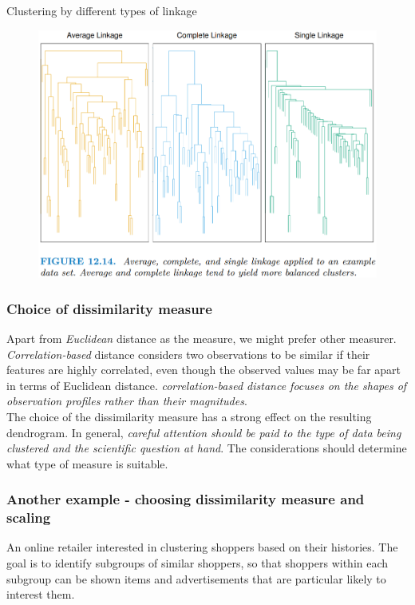 \documentclass[11pt]{article}
\begin{document}
\noindent Clustering by different types of linkage
\begin{figure}[H]
    \centering
    \includegraphics[width=0.7\linewidth]{Hierarchical clustering - visualisation of linkage.png}
\end{figure}

\subsubsection*{Choice of dissimilarity measure}
\noindent Apart from \textit{Euclidean} distance as the measure, we might prefer other measurer. \\

\noindent \textit{Correlation-based} distance considers two observations to be similar if their features are highly correlated, even though the observed values may be far apart in terms of Euclidean distance. \textit{correlation-based distance focuses on the shapes of observation profiles rather than their magnitudes}. \\

\noindent The choice of the dissimilarity measure has a strong effect on the resulting dendrogram. In general, \textit{careful attention should be paid to the type of data being clustered and the scientific question at hand}. The considerations should determine what type of measure is suitable.

\subsubsection*{Another example - choosing dissimilarity measure and scaling}
\noindent An online retailer interested in clustering shoppers based on their histories. The goal is to identify subgroups of similar shoppers, so that shoppers within each subgroup can be shown items and advertisements that are particular likely to interest them. \\
\end{document}
